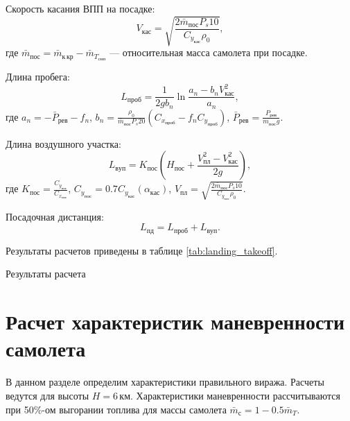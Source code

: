 Скорость касания ВПП на посадке:
\begin{equation}
    V_{кас} = \sqrt{\frac{2 \bar{m}_{пос} P_s 10 }{ C_{y_{кас}} \rho_0 }},
\end{equation}
где $\bar{m}_{пос} = \bar{m}_{к\, кр} - \bar{m}_{T_{снп}}$ --- относительная
масса самолета при посадке.

Длина пробега:
\begin{equation}
    L_{проб} = \frac{1}{2g b_n} \ln{\frac{a_n - b_n V_{кас}^2}{a_n}},
\end{equation}
где $a_n = - \bar{P}_{рев} - f_n$, $b_n = \frac{\rho_0}{\bar{m}_{пос} P_s 20}
(C_{x_{проб}} - f_n C_{y_{проб}})$, $\bar{P}_{рев} = \frac{P_{рев}}{m_{пос} g}$.

Длина воздушного участка:
\begin{equation}
    L_{вуп} = K_{пос} \left( H_{пос} + \frac{V_{пл}^2 - V_{кас}^2}{2g} \right),
\end{equation}
где $K_{пос} = \frac{C_{y_{пос}}}{C_{x_{пос}}}$, $C_{y_{пос}} = 0.7
C_{y_{кас}}(\alpha_{кас})$, $V_{пл} = \sqrt{\frac{2 \bar{m}_{пос} P_s 10
}{C_{y_{пос}} \rho_0}}$.

Посадочная дистанция:
\begin{equation}
    L_{пд} = L_{проб} + L_{вуп}.
\end{equation}

Результаты расчетов приведены в таблице \ref{tab:landing_takeoff}. 

\begin{table}[H]
    \centering
    \caption{Результаты расчета}
    \label{tab:landing_takeoff}
    
\end{table}

\section{Расчет характеристик маневренности самолета}

В данном разделе определим характеристики правильного виража.
Расчеты ведутся для высоты $H=6\, \text{км}$.
Характеристики маневренности рассчитываются при 50\%-ом выгорании
топлива для массы самолета $\bar{m}_с = 1 - 0.5 \bar{m}_T$.

